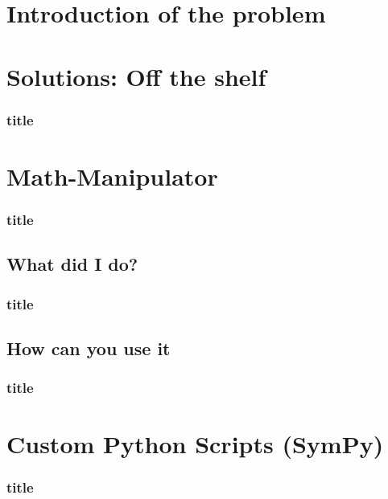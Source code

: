 
\section{Introduction of the problem}
    

    

\section{Solutions: Off the shelf}
    \begin{frame}
        \frametitle{title}
    \end{frame}

\section{Math-Manipulator}
    \begin{frame}
        \frametitle{title}
    \end{frame}

\subsection{What did I do?}
    \begin{frame}
        \frametitle{title}
    \end{frame}

\subsection{How can you use it}
    \begin{frame}
        \frametitle{title}
    \end{frame}

\section{Custom Python Scripts (SymPy)}
    \begin{frame}
        \frametitle{title}
    \end{frame}